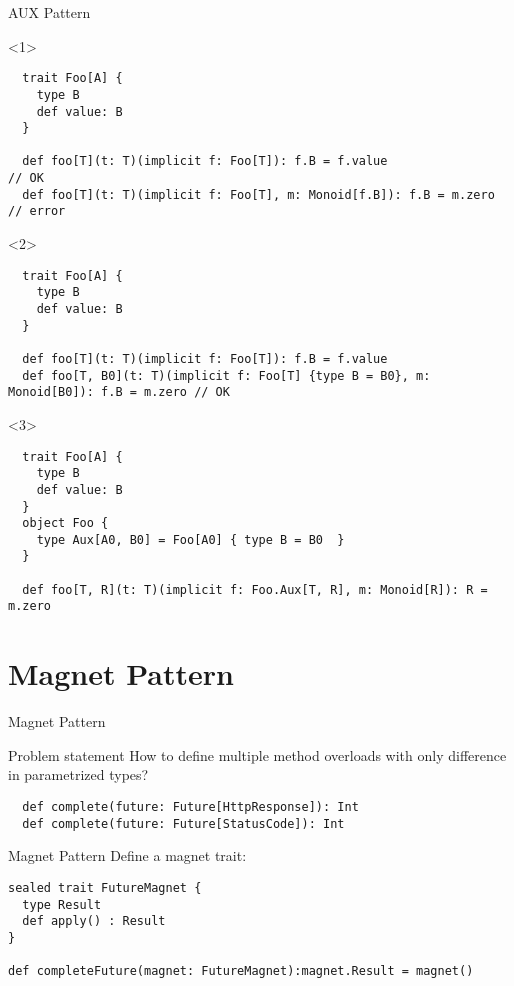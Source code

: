 \documentclass[aspectratio=169]{beamer}
\begin{document}
\begin{frame}[fragile]{AUX Pattern}
  \begin{onlyenv}<1>
  \begin{verbatim}
  trait Foo[A] {
    type B
    def value: B
  }
  
  def foo[T](t: T)(implicit f: Foo[T]): f.B = f.value                // OK
  def foo[T](t: T)(implicit f: Foo[T], m: Monoid[f.B]): f.B = m.zero // error
  \end{verbatim}
  \end{onlyenv}
\begin{onlyenv}<2>
  \begin{verbatim}
  trait Foo[A] {
    type B
    def value: B
  }
  
  def foo[T](t: T)(implicit f: Foo[T]): f.B = f.value
  def foo[T, B0](t: T)(implicit f: Foo[T] {type B = B0}, m: Monoid[B0]): f.B = m.zero // OK
  \end{verbatim}
  \end{onlyenv}
  \begin{onlyenv}<3>
  \begin{verbatim}
  trait Foo[A] {
    type B
    def value: B
  }
  object Foo {
    type Aux[A0, B0] = Foo[A0] { type B = B0  }
  }

  def foo[T, R](t: T)(implicit f: Foo.Aux[T, R], m: Monoid[R]): R = m.zero 
  \end{verbatim} 
  \end{onlyenv}
\end{frame}

\section{Magnet Pattern}
\begin{frame}[fragile]{Magnet Pattern}
  \begin{block}{Problem statement}
    How to define multiple method overloads with only difference in parametrized types?
  \end{block}
  \bigskip
  \pause
  \begin{verbatim}
  def complete(future: Future[HttpResponse]): Int
  def complete(future: Future[StatusCode]): Int
  \end{verbatim}
\end{frame}

\begin{frame}[fragile]{Magnet Pattern}
Define a magnet trait:
\begin{verbatim}
sealed trait FutureMagnet {
  type Result
  def apply() : Result
}

def completeFuture(magnet: FutureMagnet):magnet.Result = magnet()
\end{verbatim}
\end{frame}
\end{document}
